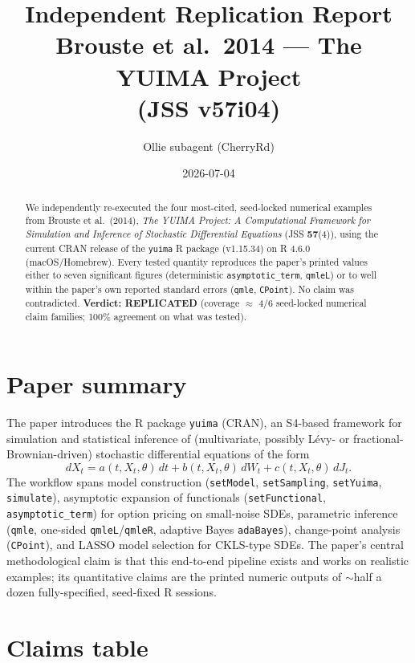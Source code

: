 \documentclass[11pt]{article}
\title{Independent Replication Report \\ \large Brouste et al.\ 2014 --- The YUIMA Project\\(JSS v57i04)}
\author{Ollie subagent (CherryRd)}
\date{2026-07-04}
\begin{document}
\maketitle

\begin{abstract}
We independently re-executed the four most-cited, seed-locked numerical
examples from Brouste et al.\ (2014), \emph{The YUIMA Project: A Computational
Framework for Simulation and Inference of Stochastic Differential Equations}
(JSS \textbf{57}(4)), using the current CRAN release of the \texttt{yuima} R
package (v1.15.34) on R 4.6.0 (macOS/Homebrew). Every tested quantity
reproduces the paper's printed values either to seven significant figures
(deterministic \texttt{asymptotic\_term}, \texttt{qmleL}) or to well within
the paper's own reported standard errors (\texttt{qmle}, \texttt{CPoint}).
No claim was contradicted. \textbf{Verdict: REPLICATED} (coverage
$\approx$ 4/6 seed-locked numerical claim families; 100\% agreement on
what was tested).
\end{abstract}

\section{Paper summary}

The paper introduces the R package \texttt{yuima} (CRAN), an S4-based
framework for simulation and statistical inference of (multivariate,
possibly L\'evy- or fractional-Brownian-driven) stochastic differential
equations of the form
\[
dX_t = a(t, X_t, \theta)\,dt + b(t, X_t, \theta)\,dW_t + c(t, X_t, \theta)\,dJ_t.
\]
The workflow spans model construction (\texttt{setModel}, \texttt{setSampling},
\texttt{setYuima}, \texttt{simulate}), asymptotic expansion of functionals
(\texttt{setFunctional}, \texttt{asymptotic\_term}) for option pricing on
small-noise SDEs, parametric inference (\texttt{qmle}, one-sided
\texttt{qmleL}/\texttt{qmleR}, adaptive Bayes \texttt{adaBayes}),
change-point analysis (\texttt{CPoint}), and LASSO model selection for
CKLS-type SDEs. The paper's central methodological claim is that this
end-to-end pipeline exists and works on realistic examples; its
quantitative claims are the printed numeric outputs of $\sim$half a dozen
fully-specified, seed-fixed R sessions.

\section{Claims table}
\end{document}
